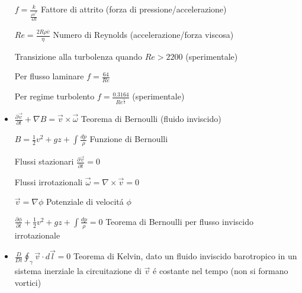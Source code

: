 \documentclass[a4paper]{article}
\begin{document}
\begin{itemize}
	$f=\frac{k}{\frac{\rho \overline{v}^2}{4R}}$ Fattore di attrito (forza di pressione/accelerazione)
	
	$Re = \frac{2R\rho \overline{v}}{\eta} $ Numero di Reynolds (accelerazione/forza viscosa)
	
	Transizione alla turbolenza quando $Re > 2200$ (sperimentale)
	
	Per flusso laminare $f = \frac{64}{Re}$
	
	Per regime turbolento $f= \frac{0.3164}{Re^\frac{1}{4}}$ (sperimentale)
	
	\item $\frac{\partial \overrightarrow{v}}{\partial t} + \nabla B = \overrightarrow{v} \times \overrightarrow{\omega}$ Teorema di Bernoulli (fluido inviscido)
	
	$B=\frac{1}{2}v^2 + gz + \int \frac{dp}{\rho}$ Funzione di Bernoulli
	
	Flussi stazionari $\frac{\partial \overrightarrow{v}}{\partial t}=0$
	
	Flussi irrotazionali $\overrightarrow{\omega}=\nabla \times \overrightarrow{v}=0$
	
	$\overrightarrow{v}=\nabla \phi$ Potenziale di velocit\'a $\phi$
	
	$\frac{\partial \phi}{\partial t}+\frac{1}{2}v^2 + gz + \int \frac{dp}{\rho}=0$ Teorema di Bernoulli per flusso inviscido irrotazionale
	
	\item $ \frac{D}{Dt} \oint_\gamma \overrightarrow{v} \cdot d\overrightarrow{l} = 0 $ Teorema di Kelvin, dato un fluido inviscido barotropico in un sistema inerziale la circuitazione di $\overrightarrow{v}$ \'e costante nel tempo (non si formano vortici)
	
\end{itemize}	
	
\end{document}
